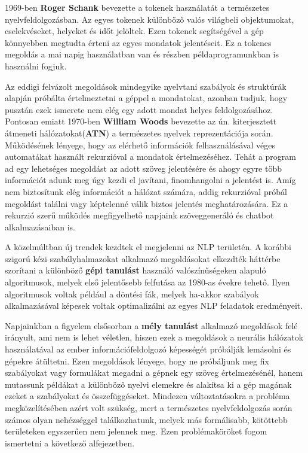 1969-ben \textbf{Roger Schank} bevezette a tokenek használatát a természetes \\
nyelvfeldolgozásban.\cite{history} Az egyes tokenek különböző valós világbeli objektumokat, cselekvéseket, helyeket és időt jelöltek. Ezen tokenek segítségével a gép könnyebben megtudta érteni az egyes mondatok jelentéseit. Ez a tokenes megoldás a mai napig használatban van és részben példaprogramunkban is használni fogjuk.

Az eddigi felvázolt megoldások mindegyike nyelvtani szabályok és struktúrák alapján próbálta értelmeztetni a géppel a mondatokat, azonban tudjuk, hogy pusztán ezek ismerete nem elég egy adott mondat helyes feldolgozásához. Pontosan emiatt 1970-ben \textbf{William Woods} bevezette az ún. kiterjesztett átmeneti hálózatokat(\textbf{ATN}) a természetes nyelvek reprezentációja során.\cite{atn} Működésének lényege, hogy az elérhető információk felhasználásával véges automatákat használt rekurzióval a mondatok értelmezéséhez. Tehát a program ad egy lehetséges megoldást az adott szöveg jelentésére és ahogy egyre több információt adunk meg úgy kezdi el javítani, finomhangolni a jelentést is. Amíg nem biztosítunk elég információt a hálózat számára, addig rekurzióval próbál megoldást találni vagy képtelenné válik biztos jelentés meghatározására. Ez a rekurzió szerű működés megfigyelhető napjaink szöveggeneráló és chatbot alkalmazásaiban is.

A közelmúltban új trendek kezdtek el megjelenni az NLP területén. A korábbi szigorú kézi szabályhalmazokat alkalmazó megoldásokat elkezdték háttérbe szorítani a különböző \textbf{gépi tanulást} használó valószínűségeken alapuló algoritmusok, melyek első jelentősebb felfutása az 1980-as évekre tehető. Ilyen algoritmusok voltak például a döntési fák, melyek ha-akkor szabályok alkalmazásával képesek voltak optimalizálni az egyes NLP feladatok eredményeit.

Napjainkban a figyelem elsősorban a \textbf{mély tanulást} alkalmazó megoldások felé irányult, ami nem is lehet véletlen, hiszen ezek a megoldások a neurális hálózatok használatával az ember információfeldolgozó képességét próbálják lemásolni és gépekre átültetni. Ezen megoldások lényege, hogy ne próbáljunk meg fix szabályokat vagy formulákat megadni a gépnek egy szöveg értelmezésénél, hanem mutassunk példákat a különböző nyelvi elemekre és alakítsa ki a gép magának ezeket a szabályokat és összefüggéseket. Mindezen változtatásokra a probléma megközelítésében azért volt szükség, mert a természetes nyelvfeldolgozás során számos olyan nehézséggel találkozhatunk, melyek más formálisabb, kötöttebb területeken egyszerűen nem jelennek meg. Ezen problémaköröket fogom ismertetni a következő alfejezetben.

